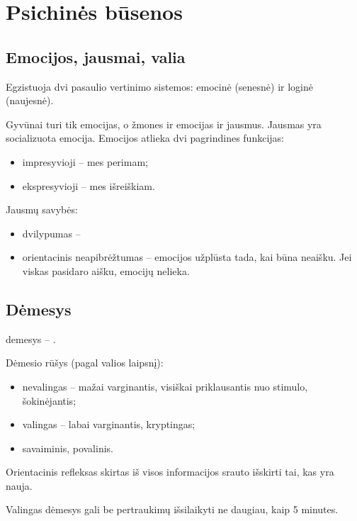 \chapter{Psichinės būsenos}

\label{psichines_busenos}

\section{Emocijos, jausmai, valia}

Egzistuoja dvi pasaulio vertinimo sistemos: emocinė (senesnė) ir loginė 
(naujesnė). 

Gyvūnai turi tik emocijas, o žmones ir emocijas ir jausmus. Jausmas yra
socializuota emocija. Emocijos atlieka dvi pagrindines funkcijas:

\begin{itemize}
  \item impresyvioji – mes perimam;
  \item ekspresyvioji – mes išreiškiam.
\end{itemize}

Jausmų savybės:

\begin{itemize}
  \item dvilypumas – %
  \item orientacinis neapibrėžtumas – emocijos užplūsta tada, kai būna
    neaišku. Jei viskas pasidaro aišku, emocijų nelieka.
\end{itemize}

\section{Dėmesys}

\Gls{demesys} – .

Dėmesio rūšys (pagal valios laipsnį):

\begin{itemize}
  \item nevalingas – mažai varginantis, visiškai priklausantis nuo stimulo, 
    šokinėjantis;
  \item valingas – labai varginantis, kryptingas;
  \item savaiminis, povalinis.  %
\end{itemize}

Orientacinis refleksas skirtas iš visos informacijos srauto išskirti tai,
kas yra nauja.

Valingas dėmesys gali be pertraukimų išsilaikyti ne daugiau, kaip 5 minutes.

